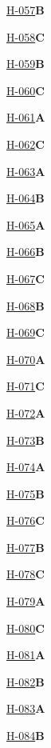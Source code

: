 \noindent\hyperref[q:H-057]{H-057}\hfill\textbf{B}\par
\noindent\hyperref[q:H-058]{H-058}\hfill\textbf{C}\par
\noindent\hyperref[q:H-059]{H-059}\hfill\textbf{B}\par
\noindent\hyperref[q:H-060]{H-060}\hfill\textbf{C}\par
\noindent\hyperref[q:H-061]{H-061}\hfill\textbf{A}\par
\noindent\hyperref[q:H-062]{H-062}\hfill\textbf{C}\par
\noindent\hyperref[q:H-063]{H-063}\hfill\textbf{A}\par
\noindent\hyperref[q:H-064]{H-064}\hfill\textbf{B}\par
\noindent\hyperref[q:H-065]{H-065}\hfill\textbf{A}\par
\noindent\hyperref[q:H-066]{H-066}\hfill\textbf{B}\par
\noindent\hyperref[q:H-067]{H-067}\hfill\textbf{C}\par
\noindent\hyperref[q:H-068]{H-068}\hfill\textbf{B}\par
\noindent\hyperref[q:H-069]{H-069}\hfill\textbf{C}\par
\noindent\hyperref[q:H-070]{H-070}\hfill\textbf{A}\par
\noindent\hyperref[q:H-071]{H-071}\hfill\textbf{C}\par
\noindent\hyperref[q:H-072]{H-072}\hfill\textbf{A}\par
\noindent\hyperref[q:H-073]{H-073}\hfill\textbf{B}\par
\noindent\hyperref[q:H-074]{H-074}\hfill\textbf{A}\par
\noindent\hyperref[q:H-075]{H-075}\hfill\textbf{B}\par
\noindent\hyperref[q:H-076]{H-076}\hfill\textbf{C}\par
\noindent\hyperref[q:H-077]{H-077}\hfill\textbf{B}\par
\noindent\hyperref[q:H-078]{H-078}\hfill\textbf{C}\par
\noindent\hyperref[q:H-079]{H-079}\hfill\textbf{A}\par
\noindent\hyperref[q:H-080]{H-080}\hfill\textbf{C}\par
\noindent\hyperref[q:H-081]{H-081}\hfill\textbf{A}\par
\noindent\hyperref[q:H-082]{H-082}\hfill\textbf{B}\par
\noindent\hyperref[q:H-083]{H-083}\hfill\textbf{A}\par
\noindent\hyperref[q:H-084]{H-084}\hfill\textbf{B}\par
